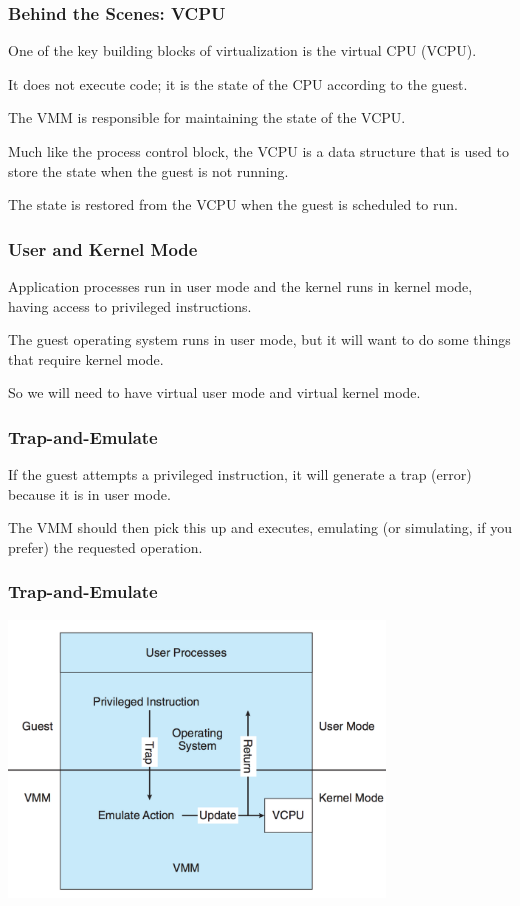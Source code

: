 \begin{frame}
\frametitle{Behind the Scenes: VCPU}

One of the key building blocks of virtualization is the \alert{virtual CPU} (VCPU). 

It does not execute code; it is the state of the CPU according to the guest. 

The VMM is responsible for maintaining the state of the VCPU. 

Much like the process control block, the VCPU is a data structure that is used to store the state when the guest is not running.

The state is restored from the VCPU when the guest is scheduled to run.

\end{frame}

\begin{frame}
\frametitle{User and Kernel Mode}

Application processes run in user mode and the kernel runs in kernel mode, having access to privileged instructions. 

The guest operating system runs in user mode, but it will want to do some things that require kernel mode.

So we will need to have virtual user mode and virtual kernel mode.

\end{frame}

\begin{frame}
\frametitle{Trap-and-Emulate}

If the guest attempts a privileged instruction, it will generate a trap (error) because it is in user mode. 

The VMM should then pick this up and executes, emulating (or simulating, if you prefer) the requested operation.

\end{frame}

\begin{frame}
\frametitle{Trap-and-Emulate}

\begin{center}
	\includegraphics[width=0.75\textwidth]{images/trap-and-emulate.png}
\end{center}

\end{frame}

